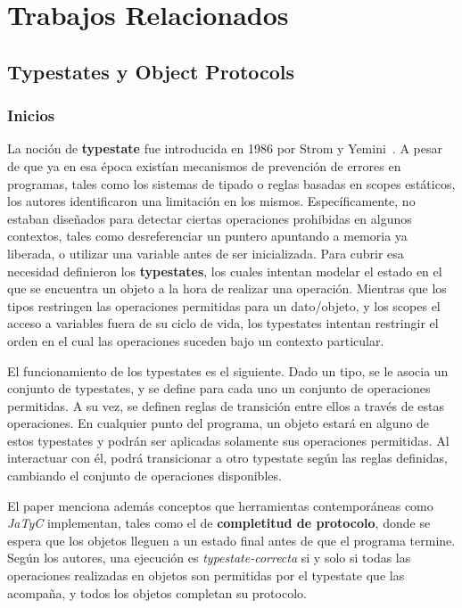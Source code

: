 \chapter{Trabajos Relacionados}

\section{Typestates y Object Protocols}

\subsection{Inicios}

La noción de \textbf{typestate} fue introducida en 1986 por Strom y Yemini~\cite{typestate}. A pesar de que ya en esa época existían mecanismos de prevención de errores en programas, tales como los sistemas de tipado o reglas basadas en scopes estáticos, los autores identificaron una limitación en los mismos. Específicamente, no estaban diseñados para detectar ciertas operaciones prohibidas en algunos contextos, tales como desreferenciar un puntero apuntando a memoria ya liberada, o utilizar una variable antes de ser inicializada. Para cubrir esa necesidad definieron los \textbf{typestates}, los cuales intentan modelar el estado en el que se encuentra un objeto a la hora de realizar una operación. Mientras que los tipos restringen las operaciones permitidas para un dato/objeto, y los scopes el acceso a variables fuera de su ciclo de vida, los typestates intentan restringir el orden en el cual las operaciones suceden bajo un contexto particular.

El funcionamiento de los typestates es el siguiente. Dado un tipo, se le asocia un conjunto de typestates, y se define para cada uno un conjunto de operaciones permitidas. A su vez, se definen reglas de transición entre ellos a través de estas operaciones. En cualquier punto del programa, un objeto estará en alguno de estos typestates y podrán ser aplicadas solamente sus operaciones permitidas. Al interactuar con él, podrá transicionar a otro typestate según las reglas definidas, cambiando el conjunto de operaciones disponibles.

El paper menciona además conceptos que herramientas contemporáneas como \textit{JaTyC} implementan, tales como el de \textbf{completitud de protocolo}, donde se espera que los objetos lleguen a un estado final antes de que el programa termine. Según los autores, una ejecución es \textit{typestate-correcta} si y solo si todas las operaciones realizadas en objetos son permitidas por el typestate que las acompaña, y todos los objetos completan su protocolo.


